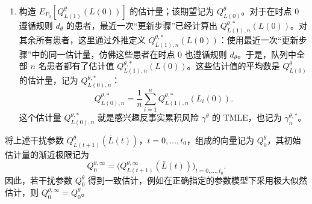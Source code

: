 \begin{enumerate}
\begin{enumerate}[label=(\alph*)]
\item 更新 $Q^\theta_{L(k+1)}(\bar L(k))$ 的初始估计量。这一更新通过预测 $Q^\theta_{L(k+2)}(\bar L(k+1))$ 的 logistic 回归实现：采用带偏移变量的仅截距模型并加权拟合，只使用在 $k$ 之前未失效，即 $\bar Y(k)=0$，并且截至 $k$ 遵循规则 $d_\theta$，即 $\bar A(k)=d_\theta(\bar L(k))$ 的患者数据。任一参与该回归的患者，其结局 $Q^{\theta,*}_{L(k+2),n}(\bar L(k+1))$ 对应的权重和偏移项分别为
\[
 \frac{1}{\prod_{t=0}^{k}g^\theta_{A(t),n}}
 \quad\text{和}\quad\logit\bigl(Q^\theta_{L(k+1),n}(\bar L(k))\bigr).
\]
该加权 logistic 回归得到的截距估计记为 $\epsilon_n$。更新后的估计量记为 $Q^{\theta,*}_{L(k+1),n}(\bar L(k))$，定义如下：（i）对在 $k$ 之前未失效、且截至 $k$ 遵循规则 $d_\theta$ 的患者，取
\[
 Q^{\theta,*}_{L(k+1),n}(\bar L(k))
 =\expit\bigl[\logit\{Q^\theta_{L(k+1),n}(\bar L(k))\}+\epsilon_n\bigr];
\]
（ii）对在 $k$ 之前已经失效、且失效前一直遵循规则 $d_\theta$ 的患者，依据式 (16.5)，将 $Q^{\theta,*}_{L(k+1),n}(\bar L(k))$ 设为 1。
\end{enumerate}

\item 构造 $E_{P_0}[Q^\theta_{L(1)}(L(0))]$ 的估计量；该期望记为 $Q^\theta_{L(0)}$。对于在时点 0 遵循规则 $d_\theta$ 的患者，最近一次“更新步骤”已经计算出 $Q^{\theta,*}_{L(1),n}(L(0))$。对其余所有患者，这里通过外推定义 $Q^{\theta,*}_{L(1),n}(L(0))$：使用最近一次“更新步骤”中的同一估计量，仿佛这些患者在时点 0 也遵循规则 $d_\theta$。于是，队列中全部 $n$ 名患者都有了估计值 $Q^{\theta,*}_{L(1),n}(L(0))$。这些估计值的平均数是 $Q^\theta_{L(0)}$ 的估计量，记为 $Q^{\theta,*}_{L(0),n}$：
\[
 Q^{\theta,*}_{L(0),n}=\frac1n\sum_{i=1}^n Q^{\theta,*}_{L(1),n}(L_i(0)).
\]
这个估计量 $Q^{\theta,*}_{L(0),n}$ 就是感兴趣反事实累积风险 $\gamma^\theta$ 的 TMLE，也记为 $\gamma^{\theta,*}_n$。
\end{enumerate}

将上述干扰参数 $Q^\theta_{L(t+1)}(\bar L(t))$，$t=0,\ldots,t_0$，组成的向量记为 $Q_0^\theta$，其初始估计量的渐近极限记为
\[
 Q_0^{\theta,\infty}=\bigl(Q^{\theta,\infty}_{L(t+1)}(\bar L(t))\bigr)_{t=0,\ldots,t_0}.
\]
因此，若干扰参数 $Q_0^\theta$ 得到一致估计，例如在正确指定的参数模型下采用极大似然估计，则 $Q_0^{\theta,\infty}=Q_0^\theta$。

